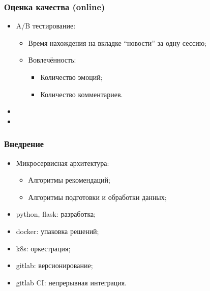 \documentclass[xetex,mathserif,serif]{beamer}
\begin{document}
\begin{frame}
	\frametitle{Оценка качества (online)}

	\begin{itemize}
		\item A/B тестирование:
            \begin{itemize}
                \item Время нахождения на вкладке ``новости'' за одну сессию;
                \item Вовлечённость:
                    \begin{itemize}
                        \item Количество эмоций;
                        \item Количество комментариев.
                    \end{itemize}
            \end{itemize}
		\item 
		\item 
	\end{itemize}
\end{frame}





\begin{frame}
	\frametitle{Внедрение}

	\begin{itemize}
		\item Микросервисная архитектура:
            \begin{itemize}
                \item Алгоритмы рекомендаций;
                \item Алгоритмы подготовки и обработки данных;
            \end{itemize}
		\item python, flask: разработка;
		\item docker: упаковка решений;
		\item k8s: оркестрация;
		\item gitlab: версионирование; 
		\item gitlab CI: непрерывная интеграция.
	\end{itemize}
\end{frame}
\end{document}
